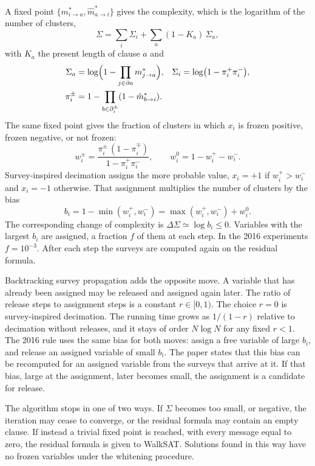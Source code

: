 \documentclass[11pt]{article}
\begin{document}
A fixed point $\{m^*_{i\to a},\hat m^*_{a\to i}\}$ gives the complexity, which is the logarithm of the number of clusters,
\begin{equation}
\Sigma
=
\sum_i \Sigma_i
+
\sum_a (1-K_a)\,\Sigma_a,
\label{eq:sigma}
\end{equation}
with $K_a$ the present length of clause $a$ and
\begin{align}
\Sigma_a
&=
\log\Bigl(1-\prod_{j\in\partial a} m^*_{j\to a}\Bigr),
&
\Sigma_i
&=
\log\bigl(1-\pi^+_i\pi^-_i\bigr),
\label{eq:sigma-parts}
\\
\pi^{\pm}_i
&=
1-\prod_{b\in\partial^{\pm}_i}(1-\hat m^*_{b\to i}).
\label{eq:pi}
\end{align}
The same fixed point gives the fraction of clusters in which $x_i$ is frozen positive, frozen negative, or not frozen:
\begin{equation}
w^{\pm}_i
=
\frac{\pi^{\pm}_i\,(1-\pi^{\mp}_i)}{1-\pi^+_i\pi^-_i},
\qquad
w^0_i
=
1-w^+_i-w^-_i.
\label{eq:w}
\end{equation}
Survey-inspired decimation assigns the more probable value, $x_i=+1$ if $w^+_i>w^-_i$ and $x_i=-1$ otherwise. That assignment multiplies the number of clusters by the bias
\begin{equation}
b_i
=
1-\min(w^+_i,w^-_i)
=
\max(w^+_i,w^-_i)+w^0_i.
\label{eq:bias}
\end{equation}
The corresponding change of complexity is $\Delta\Sigma\simeq\log b_i\le 0$. Variables with the largest $b_i$ are assigned, a fraction $f$ of them at each step. In the 2016 experiments $f=10^{-3}$. After each step the surveys are computed again on the residual formula.

Backtracking survey propagation adds the opposite move. A variable that has already been assigned may be released and assigned again later. The ratio of release steps to assignment steps is a constant $r\in[0,1)$. The choice $r=0$ is survey-inspired decimation. The running time grows as $1/(1-r)$ relative to decimation without releases, and it stays of order $N\log N$ for any fixed $r<1$. The 2016 rule uses the same bias for both moves: assign a free variable of large $b_i$, and release an assigned variable of small $b_i$. The paper states that this bias can be recomputed for an assigned variable from the surveys that arrive at it. If that bias, large at the assignment, later becomes small, the assignment is a candidate for release.

The algorithm stops in one of two ways. If $\Sigma$ becomes too small, or negative, the iteration may cease to converge, or the residual formula may contain an empty clause. If instead a trivial fixed point is reached, with every message equal to zero, the residual formula is given to WalkSAT. Solutions found in this way have no frozen variables under the whitening procedure.
\end{document}
